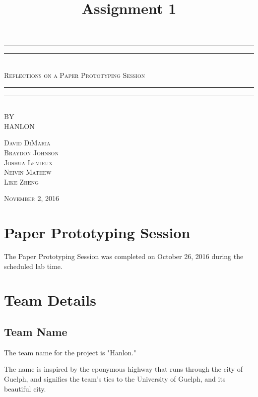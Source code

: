 \documentclass[12pt,letterpaper]{article}
\title{Assignment 1}
\begin{document}
\begin{titlepage}
    \centering
    \vspace*{\baselineskip}
    \rule{\textwidth}{1.6pt}\vspace*{-\baselineskip}\vspace*{2pt}
    \rule{\textwidth}{0.4pt}\\[1.5\baselineskip]
    {\LARGE \textsc{Reflections on a Paper Prototyping Session}}\\[\baselineskip]
	\rule{\textwidth}{0.4pt}\vspace*{-\baselineskip}\vspace{4pt}    
    \rule{\textwidth}{2pt}\\[2\baselineskip]
   
    \vspace*{5\baselineskip}
    \textsc{BY}\\[0.25\baselineskip]
    {\LARGE HANLON} \\
    
    \vspace*{\baselineskip}
    {\textsc{David DiMaria \\ Braydon Johnson \\ Joshua Lemieux \\ Neivin Mathew \\ Like Zheng} \par}
    \vfill
    {\scshape November 2, 2016} \\
  \end{titlepage}
  
  
\tableofcontents
\lhead{} %
\clearpage
{} %
    
\clearpage
\section{Paper Prototyping Session}
The Paper Prototyping Session was completed on October 26, 2016 during the scheduled lab time.
\section{Team Details}
\subsection{Team Name}
The team name for the project is "Hanlon."\par
The name is inspired by the eponymous highway that runs through the city of Guelph, and signifies the team's ties to the University of Guelph, and its beautiful city.\\
\end{document}
